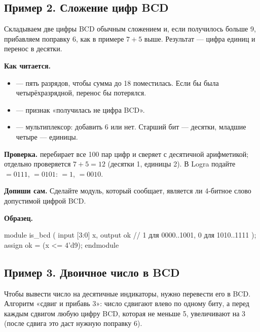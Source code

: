 \subsection{Пример 2. Сложение цифр BCD}

Складываем две цифры BCD обычным сложением и, если получилось больше 9,
прибавляем поправку 6, как в примере $7+5$ выше. Результат --- цифра единиц и
перенос в десятки.


\textbf{Как читается.}
\begin{itemize}
  \item {} --- пять разрядов, чтобы сумма до 18 поместилась. Если бы  была четырёхразрядной, перенос бы потерялся.
  \item {} --- признак «получилась не цифра BCD».
  \item {} --- мультиплексор: добавить 6 или нет. Старший бит  --- десятки, младшие четыре --- единицы.
\end{itemize}
\textbf{Проверка.}  перебирает все 100 пар цифр и сверяет с
десятичной арифметикой; отдельно проверяется $7+5=12$ (десятки 1, единицы 2).
В Logra подайте $=0111$, $=0101$: $=1$, $=0010$.

\textbf{Допиши сам.} Сделайте модуль, который сообщает, является ли 4-битное
слово допустимой цифрой BCD.

\textbf{Образец.}\par\nopagebreak
\begin{vcode}
module is_bcd (
    input  [3:0] x,
    output       ok       // 1 для 0000..1001, 0 для 1010..1111
);
    assign ok = (x <= 4'd9);
endmodule
\end{vcode}

\subsection{Пример 3. Двоичное число в BCD}

Чтобы вывести число на десятичные индикаторы, нужно перевести его в BCD.
Алгоритм «сдвиг и прибавь 3»: число сдвигают влево по одному биту, а перед каждым
сдвигом любую цифру BCD, которая не меньше 5, увеличивают на 3 (после сдвига это
даст нужную поправку 6).


